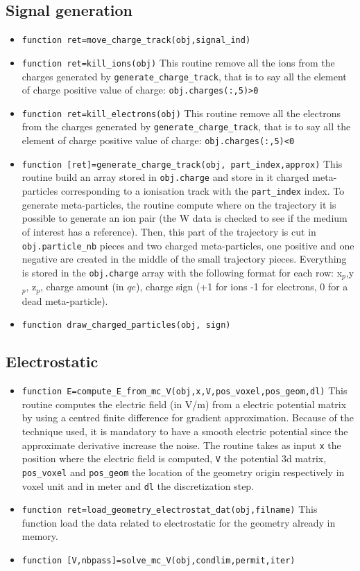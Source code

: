 \documentclass[10pt]{article}
\begin{document}
		\subsection{Signal generation}
		\begin{itemize}
		\item \lstinline{function ret=move_charge_track(obj,signal_ind)}
		\item \lstinline{function ret=kill_ions(obj)} This routine remove all the ions from the charges generated by \lstinline{generate_charge_track}, that is to say all the element of charge positive value of charge: \lstinline{obj.charges(:,5)>0}
		\item \lstinline{function ret=kill_electrons(obj)} This routine remove all the electrons from the charges generated by \lstinline{generate_charge_track}, that is to say all the element of charge positive value of charge: \lstinline{obj.charges(:,5)<0}
		\item \lstinline{function [ret]=generate_charge_track(obj, part_index,approx)} This routine build an array stored in \lstinline{obj.charge} and store in it charged meta-particles corresponding to a ionisation track with the \lstinline{part_index} index. To generate meta-particles, the routine compute where on the trajectory it is possible to generate an ion pair (the W data is checked to see if the medium of interest has a reference). Then, this part of the trajectory is cut in \lstinline{obj.particle_nb} pieces and two charged meta-particles, one positive and one negative are created in the middle of the small trajectory pieces. Everything is stored in the \lstinline{obj.charge} array with the following format for each row: x$_p$,y$_p$, z$_p$, charge amount (in $qe$), charge sign (+1 for ions -1 for electrons, 0 for a dead meta-particle).
		\item \lstinline{function draw_charged_particles(obj, sign)}
		\end{itemize}
		\subsection{Electrostatic}
		\begin{itemize}
		\item \lstinline{function E=compute_E_from_mc_V(obj,x,V,pos_voxel,pos_geom,dl)} This routine computes the electric field  (in V/m) from a electric potential matrix by using a centred finite difference for gradient approximation. Because of the technique used, it is mandatory to have a smooth electric potential since the approximate derivative increase the noise. The routine takes as input \lstinline{x} the position where the electric field is computed, \lstinline{V} the potential 3d matrix, \lstinline{pos_voxel} and \lstinline{pos_geom} the location of the geometry origin respectively in voxel unit and in meter and \lstinline{dl} the discretization step. 
		\item \lstinline{function ret=load_geometry_electrostat_dat(obj,filname)} This function load the data related to electrostatic for the geometry already in memory.
		\item \lstinline{function [V,nbpass]=solve_mc_V(obj,condlim,permit,iter)} 
		\end{itemize}
		
\end{document}
